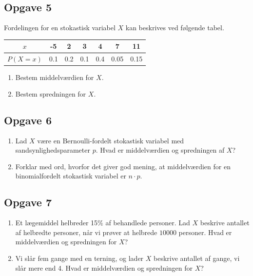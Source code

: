 \subsection*{Opgave 5}

Fordelingen for en stokastisk variabel $X$ kan beskrives ved følgende tabel.

\begin{center}
	\begin{tabular}{c|c|c|c|c|c|c}
		$x$ & -5 & 2 & 3 & 4 & 7 & 11 \\
		\hline
		$P(X = x)$ & 0.1 & 0.2 & 0.1 & 0.4 & 0.05 & 0.15
	\end{tabular}
\end{center}

\begin{enumerate}[label=\roman*)]
	\item Bestem middelværdien for $X$.
	\item Bestem spredningen for $X$.
\end{enumerate}

\subsection*{Opgave 6}
\begin{enumerate}[label=\roman*)]
\item Lad $X$ være en Bernoulli-fordelt stokastisk variabel med sandsynlighedsparameter $p$. Hvad er middelværdien og spredningen af $X$?
\item Forklar med ord, hvorfor det giver god mening, at middelværdien for en binomialfordelt stokastisk variabel er $n\cdot p$. 
\end{enumerate}

\subsection*{Opgave 7}
\begin{enumerate}[label=\roman*)]
\item Et lægemiddel helbreder 15$\%$ af behandlede personer. Lad $X$ beskrive antallet af helbredte personer, når vi prøver at helbrede $10000$ personer. Hvad er middelværdien og spredningen for $X$?
\item Vi slår fem gange med en terning, og lader $X$ beskrive antallet af gange, vi slår mere end 4. Hvad er middelværdien og spredningen for $X$?

\end{enumerate}